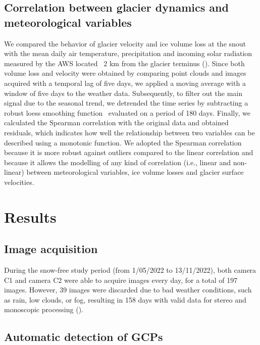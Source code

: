 \subsection{Correlation between glacier dynamics and meteorological variables}
\label{sec:4:meteoanalysis}
We compared the behavior of glacier velocity and ice volume loss at the snout with the
mean daily air temperature, precipitation and incoming solar radiation measured by the
AWS located ~2 km from the glacier terminus ().
Since both volume loss and velocity were obtained by comparing point clouds and images
acquired with a temporal lag of five days, we applied a moving average with a window of
five days to the weather data. Subsequently, to filter out the main signal due to the
seasonal trend, we detrended the time series by subtracting a robust loess smoothing
function~\citep{Cleveland1979} evaluated on a period of 180 days.
Finally, we calculated the Spearman correlation with the original data and obtained
residuals, which indicates how well the relationship between two variables can be
described using a monotonic function.
We adopted the Spearman correlation because it is more robust against outliers compared
to the linear correlation and because it allows the modelling of any kind of correlation
(i.e., linear and non-linear) between meteorological variables, ice volume losses and
glacier surface velocities.


\section{Results}\label{sec:4:results}

\subsection{Image acquisition}\label{sec:4:res_images}

During the snow-free study period (from 1/05/2022 to 13/11/2022), both camera C1 and
camera C2 were able to acquire images every day, for a total of 197 images. However, 39
images were discarded due to bad weather conditions, such as rain, low clouds, or fog,
resulting in 158 days with valid data for stereo and monoscopic processing
().

\subsection{Automatic detection of GCPs}\label{sec:4:res_gcptracking}

